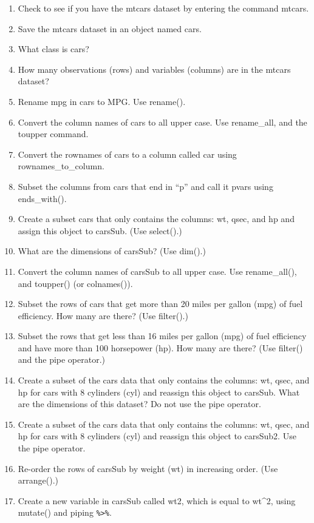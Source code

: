 \documentclass[
  12pt,
  oneside]{book}
\providecommand{\tightlist}{%
  \setlength{\itemsep}{0pt}\setlength{\parskip}{0pt}}
\begin{document}
\begin{enumerate}
\def\labelenumi{\arabic{enumi}.}
\tightlist
\item
  Check to see if you have the mtcars dataset by entering the command mtcars.
\item
  Save the mtcars dataset in an object named cars.
\item
  What class is cars?
\item
  How many observations (rows) and variables (columns) are in the mtcars dataset?
\item
  Rename mpg in cars to MPG. Use rename().
\item
  Convert the column names of cars to all upper case. Use rename\_all, and the toupper command.
\item
  Convert the rownames of cars to a column called car using rownames\_to\_column.
\item
  Subset the columns from cars that end in ``p'' and call it pvars using ends\_with().
\item
  Create a subset cars that only contains the columns: wt, qsec, and hp and assign this object to carsSub. (Use select().)
\item
  What are the dimensions of carsSub? (Use dim().)
\item
  Convert the column names of carsSub to all upper case. Use rename\_all(), and toupper() (or colnames()).
\item
  Subset the rows of cars that get more than 20 miles per gallon (mpg) of fuel efficiency. How many are there? (Use filter().)
\item
  Subset the rows that get less than 16 miles per gallon (mpg) of fuel efficiency and have more than 100 horsepower (hp). How many are there? (Use filter() and the pipe operator.)
\item
  Create a subset of the cars data that only contains the columns: wt, qsec, and hp for cars with 8 cylinders (cyl) and reassign this object to carsSub. What are the dimensions of this dataset? Do not use the pipe operator.
\item
  Create a subset of the cars data that only contains the columns: wt, qsec, and hp for cars with 8 cylinders (cyl) and reassign this object to carsSub2. Use the pipe operator.
\item
  Re-order the rows of carsSub by weight (wt) in increasing order. (Use arrange().)
\item
  Create a new variable in carsSub called wt2, which is equal to wt\^{}2, using mutate() and piping \texttt{\%\textgreater{}\%}.
\end{enumerate}
\end{document}
